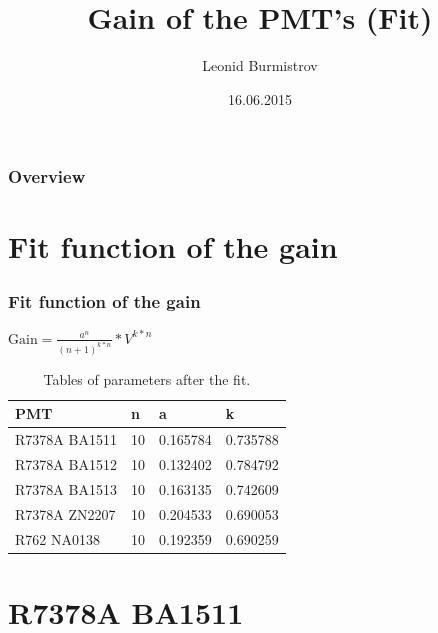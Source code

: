 \documentclass{beamer}
\title[Short title]{Gain of the PMT's (Fit)} %
\author{Leonid Burmistrov} %
\institute[LAL, Orsay] %
{
Laboratoire de l'accelerateur lineaire \\ %
\medskip
\textit{burmist@lal.in2p3.fr} %
}
\date{16.06.2015} %
\begin{document}
\begin{frame}
\titlepage %
\end{frame}

\begin{frame}
\frametitle{Overview} %
\tableofcontents %
\end{frame}

\section{Fit function of the gain}
\begin{frame}
\frametitle{Fit function of the gain}
$\mathrm{Gain} = \frac{a^n}{(n+1)^{k*n}} * V^{k*n}$
\begin{table}
\begin{tabular}{l l l l}
\toprule
\textbf{PMT} & \textbf{n} & \textbf{a} & \textbf{k} \\
\midrule
R7378A BA1511 & 10 & 0.165784 & 0.735788\\
R7378A BA1512 & 10 & 0.132402 & 0.784792\\
R7378A BA1513 & 10 & 0.163135 & 0.742609\\
R7378A ZN2207 & 10 & 0.204533 & 0.690053\\
R762 NA0138   & 10 & 0.192359 & 0.690259\\
\bottomrule
\end{tabular}
\caption{Tables of parameters after the fit.}
\end{table}
\end{frame}


\section{R7378A BA1511}
\end{document}
